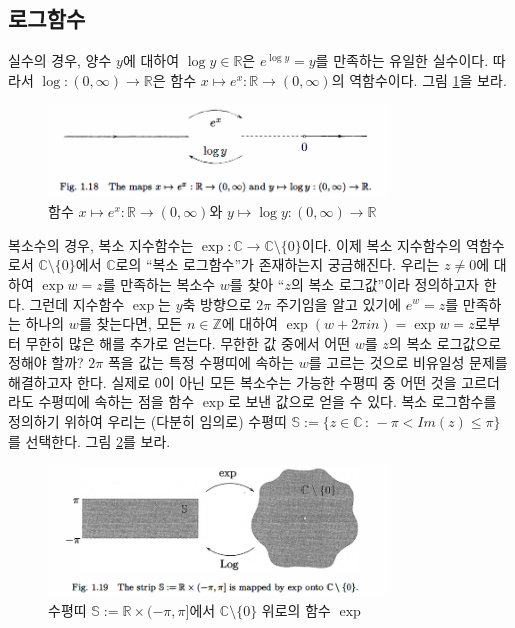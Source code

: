 \subsection{로그함수}

실수의 경우,
양수 $y$에 대하여 $\log y\in \mathbb R$은
$e^{\log y} = y$를 만족하는 유일한 실수이다.
따라서 $\log : (0,\infty) \to \mathbb R$은 
함수 $x\mapsto e^x: \mathbb R \to (0,\infty)$의 역함수이다.
그림 \ref{fig-1-18}을 보라.

\begin{figure}[!h]
\begin{center}
\includegraphics[width=0.8\textwidth]{./SaltChapter/fig-1-18}
\end{center}
\caption{함수 $x\mapsto e^x : \mathbb R \to (0,\infty)$와
$y\mapsto \log y : (0,\infty) \to \mathbb R$}
\label{fig-1-18}
\end{figure}

복소수의 경우,
복소 지수함수는 $\exp: \mathbb C \to \mathbb C\setminus \{0\}$이다.
이제 복소 지수함수의 역함수로서 $\mathbb C\setminus \{0\}$에서 $\mathbb C$로의
``복소 로그함수''가 존재하는지 궁금해진다.
우리는 $z\ne0$에 대하여 $\exp w = z$를 만족하는 복소수 $w$를 찾아
``$z$의 복소 로그값''이라 정의하고자 한다.
그런데  지수함수 $\exp$는 $y$축 방향으로 $2\pi$ 주기임을 알고 있기에
$e^w =z$를 만족하는 하나의 $w$를 찾는다면,
모든 $n\in\mathbb Z$에 대하여 $\exp(w+2\pi i n) = \exp w = z$로부터
무한히 많은 해를 추가로 얻는다.
무한한 값 중에서 어떤 $w$를 $z$의 복소 로그값으로 정해야 할까?
$2\pi$ 폭을 값는 특정 수평띠에 속하는
$w$를 고르는 것으로 비유일성 문제를  해결하고자 한다.
실제로 $0$이 아닌 모든 복소수는 
가능한 수평띠 중 어떤 것을 고르더라도 
수평띠에 속하는 점을 함수 $\exp$로 보낸 값으로 얻을 수 있다.
복소 로그함수를 정의하기 위하여
우리는 (다분히 임의로) 수평띠 $\mathbb S := \{ z\in\mathbb C\,:\, -\pi < Im(z) \le \pi\}$를
선택한다. 그림  \ref{fig-1-19}를 보라.

\begin{figure}[!h]
\begin{center}
\includegraphics[width=0.8\textwidth]{./SaltChapter/fig-1-19}
\end{center}
\caption{수평띠 $\mathbb S := \mathbb R \times (-\pi, \pi]$에서
$\mathbb C\setminus \{0\}$ 위로의 함수 $\exp$}
\label{fig-1-19}
\end{figure}

